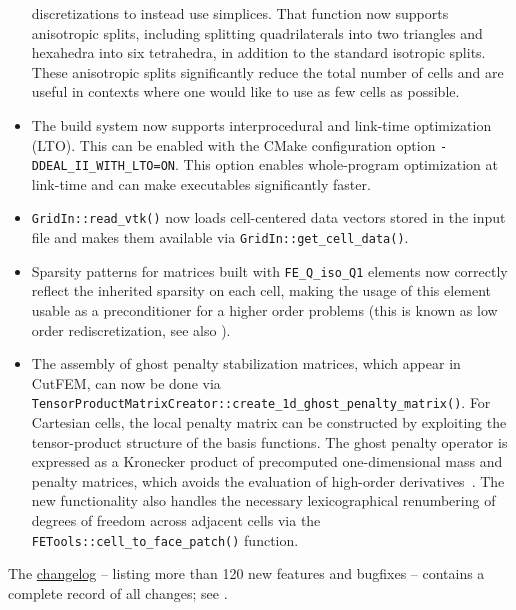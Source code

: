 \documentclass{ansarticle-preprint}
\begin{document}
\begin{itemize}
  discretizations to instead use simplices. That function now supports
  anisotropic splits, including splitting quadrilaterals into two triangles and
  hexahedra into six tetrahedra, in addition to the standard isotropic splits.
  These anisotropic splits significantly reduce the total number of cells and
  are useful in contexts where one would like to use as few cells as
  possible.
\item The build system now supports interprocedural and link-time optimization
  (LTO). This can be enabled with the CMake configuration option
  \texttt{-DDEAL\_II\_WITH\_LTO=ON}. This option enables whole-program
  optimization at link-time and can make executables significantly faster.
\item \texttt{GridIn::read\_vtk()} now loads cell-centered data vectors stored
  in the input file and makes them available via
  \texttt{GridIn::get\_cell\_data()}.
\item Sparsity patterns for matrices built with \texttt{FE\_Q\_iso\_Q1} elements
  now correctly reflect the inherited sparsity on each cell, making the usage of
  this element usable as a preconditioner for a higher order problems (this is known
  as low order rediscretization, see also \cite{pazner2023low}).
  \item The assembly of ghost penalty stabilization matrices, which appear in CutFEM, can now be done
    via \texttt{TensorProductMatrixCreator::create\_1d\_ghost\_penalty\_matrix()}. For Cartesian cells, the local penalty matrix can be constructed by exploiting the tensor-product structure
    of the basis functions. The ghost penalty operator is expressed as
    a Kronecker product of precomputed one-dimensional mass and penalty matrices,
    which avoids the evaluation of high-order derivatives~\cite{wichrowski2025matrix}.
    The new functionality also handles the necessary lexicographical renumbering
    of degrees of freedom across adjacent cells via the
    \texttt{FETools::cell\_to\_face\_patch()} function.
\end{itemize}
%
The
\href{https://dealii.org/current/doxygen/deal.II/changes_between_9_6_0_and_9_7_0.html}{changelog}
-- listing more than 120
new features and bugfixes --
contains a complete record of all changes; see \cite{changes97}.



\end{document}
